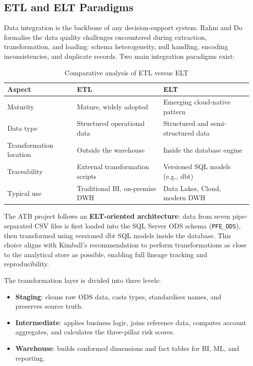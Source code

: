 \subsection{ETL and ELT Paradigms}

Data integration is the backbone of any decision-support system. Rahm and Do \cite{rahm2000}
formalise the data quality challenges encountered during extraction, transformation, and
loading: schema heterogeneity, null handling, encoding inconsistencies, and duplicate
records. Two main integration paradigms exist:

\begin{table}[H]
\centering
\caption{Comparative analysis of ETL versus ELT}
\label{tab:atb_etl_elt}
\begin{tabular}{|p{3cm}|p{5cm}|p{5cm}|}
\hline
\rowcolor{blue!15}
\textbf{Aspect} & \textbf{ETL} & \textbf{ELT} \\
\hline
Maturity & Mature, widely adopted & Emerging cloud-native pattern \\
\hline
Data type & Structured operational data & Structured and semi-structured data \\
\hline
Transformation location & Outside the warehouse & Inside the database engine \\
\hline
Traceability & External transformation scripts & Versioned SQL models (e.g., dbt) \\
\hline
Typical use & Traditional BI, on-premise DWH & Data Lakes, Cloud, modern DWH \\
\hline
\end{tabular}
\end{table}

The ATB project follows an \textbf{ELT-oriented architecture}: data from seven
pipe-separated CSV files is first loaded into the SQL Server ODS schema
(\texttt{PFE\_ODS}), then transformed using versioned dbt SQL models inside the database.
This choice aligns with Kimball's recommendation \cite{kimball2013} to perform
transformations as close to the analytical store as possible, enabling full lineage tracking
and reproducibility.

The transformation layer is divided into three levels:

\begin{itemize}
    \item \textbf{Staging}: cleans raw ODS data, casts types, standardises names,
    and preserves source truth.
    \item \textbf{Intermediate}: applies business logic, joins reference data, computes
    account aggregates, and calculates the three-pillar risk scores.
    \item \textbf{Warehouse}: builds conformed dimensions and fact tables for BI, ML,
    and reporting.
\end{itemize}

